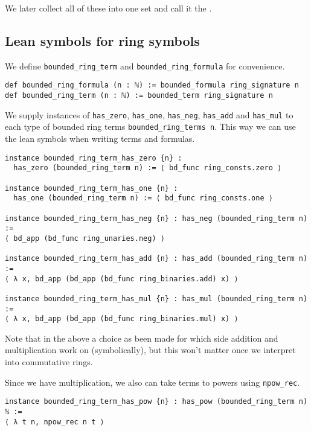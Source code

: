 We later collect all of these into one set and call it the
.

\subsection{Lean symbols for ring symbols}

We define \texttt{bounded\_ring\_term} and \texttt{bounded\_ring\_formula}
for convenience.

\begin{lstlisting}
def bounded_ring_formula (n : ℕ) := bounded_formula ring_signature n
def bounded_ring_term (n : ℕ) := bounded_term ring_signature n\end{lstlisting}

We supply instances of \texttt{has\_zero}, \texttt{has\_one}, \texttt{has\_neg},
\texttt{has\_add} and \texttt{has\_mul} to each type of bounded ring terms
\texttt{bounded\_ring\_terms n}.
This way we can use the lean symbols when writing terms and formulas.

\begin{lstlisting}
instance bounded_ring_term_has_zero {n} :
  has_zero (bounded_ring_term n) := ⟨ bd_func ring_consts.zero ⟩

instance bounded_ring_term_has_one {n} :
  has_one (bounded_ring_term n) := ⟨ bd_func ring_consts.one ⟩

instance bounded_ring_term_has_neg {n} : has_neg (bounded_ring_term n) :=
⟨ bd_app (bd_func ring_unaries.neg) ⟩

instance bounded_ring_term_has_add {n} : has_add (bounded_ring_term n) :=
⟨ λ x, bd_app (bd_app (bd_func ring_binaries.add) x) ⟩

instance bounded_ring_term_has_mul {n} : has_mul (bounded_ring_term n) :=
⟨ λ x, bd_app (bd_app (bd_func ring_binaries.mul) x) ⟩\end{lstlisting}

Note that in the above a choice as been made for which side
addition and multiplication work on (symbolically),
but this won't matter once we interpret into commutative rings.

Since we have multiplication, we also can take terms to powers
using \texttt{npow\_rec}.

\begin{lstlisting}
instance bounded_ring_term_has_pow {n} : has_pow (bounded_ring_term n) ℕ :=
⟨ λ t n, npow_rec n t ⟩
\end{lstlisting}


